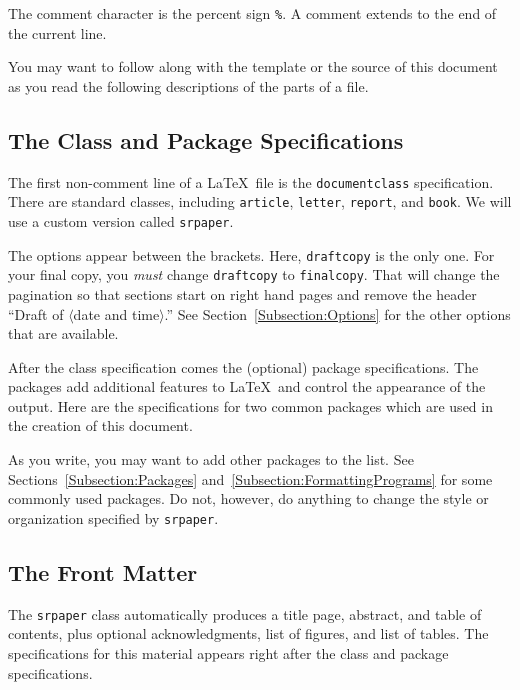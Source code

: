\documentclass[finalcopy]{srpaper}
\def\hyperref[#1]{}
\let\plainref\ref
\newcommand{\plainref}{\ref*}
\newcommand{\namedref}[2]{\hyperref[#2]{#1~\plainref{#2}}}
\begin{document}
The comment character is the percent sign \verb|%|. 
A comment extends to the end of the current line. 

You may want to follow along with the template or the
source of this document as you read the following
descriptions of the parts of a file.

\subsection{The Class and Package Specifications}
\label{Subsection:ClassAndPackage}
The first non-comment line of a \LaTeX\ file is the
\texttt{documentclass} specification. There are standard
classes, including \texttt{article}, \texttt{letter},
\texttt{report}, and \texttt{book}. We will use a custom
version called
\texttt{srpaper}.%
The options appear between the brackets. Here,
\texttt{draftcopy} is the only one.  For your final copy,
you \emph{must} change \texttt{draftcopy} to
\texttt{finalcopy}. That will change the pagination so that
sections start on right hand pages and remove the header
``Draft of $\langle$\textsf{date and time}$\rangle$.'' See
\namedref{Section}{Subsection:Options} for the other options
that are available.

After the class specification comes the (optional) package
specifications. The packages add additional features to
\LaTeX\ and control the appearance of the output. Here are
the specifications for two common packages which are used in
the creation of this document.
\begin{vcode}
\usepackage{url}
\usepackage{graphicx}
\end{vcode}
As you write, you may want to add other packages to the
list. See \namedref{Sections}{Subsection:Packages}
and~\ref{Subsection:FormattingPrograms} for some commonly
used packages. Do not, however, do anything to change the
style or organization specified by \texttt{srpaper}.

\subsection{The Front Matter}
The \texttt{srpaper}%
class automatically produces a title
page, abstract, and table of contents, plus optional
acknowledgments, list of figures, and list of
tables. The specifications for this material appears right
after the class and package specifications.
\end{document}
